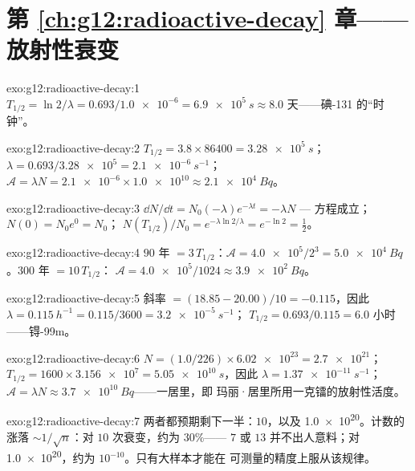 \section*{第 \ref{ch:g12:radioactive-decay} 章——放射性衰变}

\begin{solution}{exo:g12:radioactive-decay:1}
$T_{1/2} = \ln 2/\lambda = 0.693/\num{1.0e-6} = \qty{6.9e5}{s}
\approx 8.0$ 天——碘-131 的“时钟”。
\end{solution}

\begin{solution}{exo:g12:radioactive-decay:2}
$T_{1/2} = 3.8 \times \num{86400} = \qty{3.28e5}{s}$；
$\lambda = 0.693/\num{3.28e5} = \qty{2.1e-6}{s^{-1}}$；
$\mathcal A = \lambda N = \num{2.1e-6} \times \num{1.0e10} \approx
\qty{2.1e4}{Bq}$。
\end{solution}

\begin{solution}{exo:g12:radioactive-decay:3}
$\dd N/\dd t = N_0(-\lambda)e^{-\lambda t} = -\lambda N$ ---
方程成立；$N(0) = N_0 e^0 = N_0$；
$N(T_{1/2})/N_0 = e^{-\lambda \ln 2/\lambda} = e^{-\ln 2} =
\tfrac12$。
\end{solution}

\begin{solution}{exo:g12:radioactive-decay:4}
$90$ 年 $= 3\,T_{1/2}$：$\mathcal A = \num{4.0e5}/2^3 =
\qty{5.0e4}{Bq}$。$300$ 年 $= 10\,T_{1/2}$：
$\mathcal A = \num{4.0e5}/1024 \approx \qty{3.9e2}{Bq}$。
\end{solution}

\begin{solution}{exo:g12:radioactive-decay:5}
斜率 $= (18.85 - 20.00)/10 = -0.115$，因此
$\lambda = \qty{0.115}{h^{-1}} = 0.115/3600 = \qty{3.2e-5}{s^{-1}}$；
$T_{1/2} = 0.693/0.115 = 6.0$ 小时——锝-99m。
\end{solution}

\begin{solution}{exo:g12:radioactive-decay:6}
$N = (1.0/226) \times \num{6.02e23} = \num{2.7e21}$；
$T_{1/2} = 1600 \times \num{3.156e7} = \qty{5.05e10}{s}$，因此
$\lambda = \qty{1.37e-11}{s^{-1}}$；
$\mathcal A = \lambda N \approx \qty{3.7e10}{Bq}$——一居里，即
玛丽·居里所用一克镭的放射性活度。
\end{solution}

\begin{solution}{exo:g12:radioactive-decay:7}
两者都预期剩下一半：$10$，以及 \num{1.0e20}。计数的涨落
$\sim 1/\sqrt{n}$：对 $10$ 次衰变，约为 $30\%$——
$7$ 或 $13$ 并不出人意料；对 \num{1.0e20}，约为
$10^{-10}$。只有大样本才能在
可测量的精度上服从该规律。
\end{solution}

